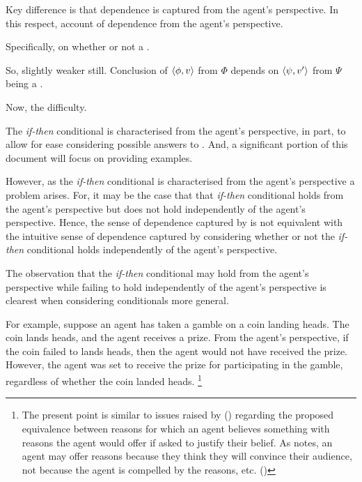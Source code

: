 \begin{note}
  Key difference is that dependence is captured from the agent's perspective.
  In this respect, account of dependence from the agent's perspective.

  Specifically, on whether or not a \fc{}.

  So, slightly weaker still.
  Conclusion of \(\langle \phi, v \rangle\) from \(\Phi\) depends on \(\langle \psi, v' \rangle\) from \(\Psi\) being a \fc{}.
\end{note}

\begin{note}
  Now, the difficulty.
\end{note}

\begin{note}
  The \emph{if-then} conditional is characterised from the agent's perspective, in part, to allow for ease considering possible answers to \qWhyV{}.
  And, a significant portion of this document will focus on providing examples.

  However, as the \emph{if-then} conditional is characterised from the agent's perspective a problem arises.
  For, it may be the case that that \emph{if-then} conditional holds from the agent's perspective but does not hold independently of the agent's perspective.
  Hence, the sense of dependence captured by \qWhyV{} is not equivalent with the intuitive sense of dependence captured by considering whether or not the \emph{if-then} conditional holds independently of the agent's perspective.

  The observation that the \emph{if-then} conditional may hold from the agent's perspective while failing to hold independently of the agent's perspective is clearest when considering conditionals more general.

  For example, suppose an agent has taken a gamble on a coin landing heads.
  The coin lands heads, and the agent receives a prize.
  From the agent's perspective, if the coin failed to lands heads, then the agent would not have received the prize.
  However, the agent was set to receive the prize for participating in the gamble, regardless of whether the coin landed heads.%
  \footnote{
    The present point is similar to issues raised by \citeauthor{Harman:1973ww} (\citeyear{Harman:1973ww}) regarding the proposed equivalence between reasons for which an agent believes something with reasons the agent would offer if asked to justify their belief.
  As \citeauthor{Harman:1973ww} notes, an agent may offer reasons because they think they will convince their audience, not because the agent is compelled by the reasons, etc.
  (\citeyear[Ch.2]{Harman:1973ww})

}
\end{note}

